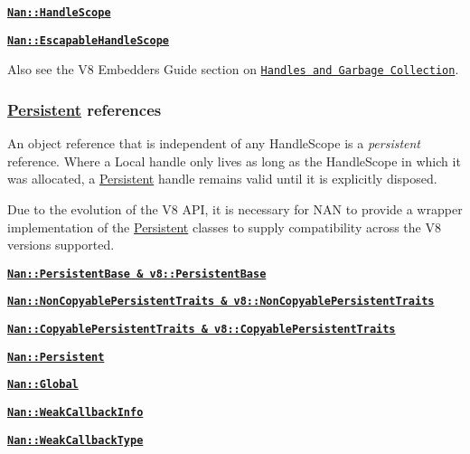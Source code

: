 \begin{DoxyItemize}
\item \href{doc/scopes.md#api_nan_handle_scope}{\tt {\bfseries {\ttfamily Nan\+::\+Handle\+Scope}}}
\item \href{doc/scopes.md#api_nan_escapable_handle_scope}{\tt {\bfseries {\ttfamily Nan\+::\+Escapable\+Handle\+Scope}}}
\end{DoxyItemize}

Also see the V8 Embedders Guide section on \href{https://developers.google.com/v8/embed#handles}{\tt Handles and Garbage Collection}.

\subsubsection*{\hyperlink{class_persistent}{Persistent} references}

An object reference that is independent of any {\ttfamily Handle\+Scope} is a {\itshape persistent} reference. Where a {\ttfamily Local} handle only lives as long as the {\ttfamily Handle\+Scope} in which it was allocated, a {\ttfamily \hyperlink{class_persistent}{Persistent}} handle remains valid until it is explicitly disposed.

Due to the evolution of the V8 A\+PI, it is necessary for N\+AN to provide a wrapper implementation of the {\ttfamily \hyperlink{class_persistent}{Persistent}} classes to supply compatibility across the V8 versions supported.


\begin{DoxyItemize}
\item \href{doc/persistent.md#api_nan_persistent_base}{\tt {\bfseries {\ttfamily Nan\+::\+Persistent\+Base \& v8\+::\+Persistent\+Base}}}
\item \href{doc/persistent.md#api_nan_non_copyable_persistent_traits}{\tt {\bfseries {\ttfamily Nan\+::\+Non\+Copyable\+Persistent\+Traits \& v8\+::\+Non\+Copyable\+Persistent\+Traits}}}
\item \href{doc/persistent.md#api_nan_copyable_persistent_traits}{\tt {\bfseries {\ttfamily Nan\+::\+Copyable\+Persistent\+Traits \& v8\+::\+Copyable\+Persistent\+Traits}}}
\item \href{doc/persistent.md#api_nan_persistent}{\tt {\bfseries {\ttfamily Nan\+::\+Persistent}}}
\item \href{doc/persistent.md#api_nan_global}{\tt {\bfseries {\ttfamily Nan\+::\+Global}}}
\item \href{doc/persistent.md#api_nan_weak_callback_info}{\tt {\bfseries {\ttfamily Nan\+::\+Weak\+Callback\+Info}}}
\item \href{doc/persistent.md#api_nan_weak_callback_type}{\tt {\bfseries {\ttfamily Nan\+::\+Weak\+Callback\+Type}}}
\end{DoxyItemize}

